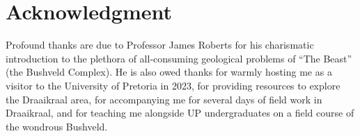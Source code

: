 \section{Acknowledgment}
\label{sec:ch5-acknowledgments}

Profound thanks are due to Professor James Roberts for his charismatic
introduction to the plethora of all-consuming geological problems of
``The Beast'' (the Bushveld Complex). He is also owed thanks for warmly
hosting me as a visitor to the University of Pretoria in 2023, for
providing resources to explore the Draaikraal area, for accompanying me
for several days of field work in Draaikraal, and for teaching me
alongside UP undergraduates on a field course of the wondrous Bushveld.

